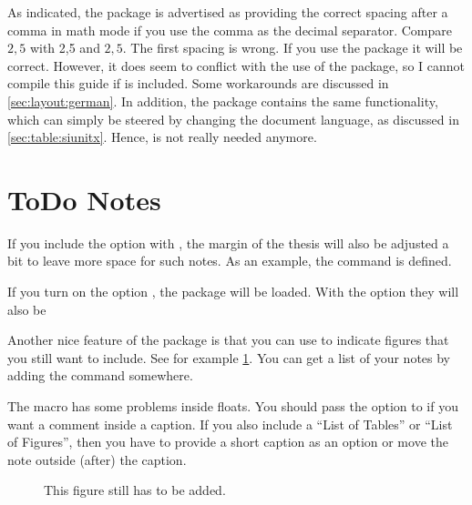 As indicated, the  package is advertised as providing
the correct spacing after a comma in math mode if you use the comma as
the decimal separator. Compare \(2,5\) with 2,5 and \(2{,}5\). The first
spacing is wrong. If you use the  package it will be
correct. However, it does seem to conflict with the use of the
 package, so I cannot compile this guide
if  is included. Some  workarounds are discussed in
\cref{sec:layout:german}. In addition, the 
package contains the same functionality, which can simply be steered
by changing the document language, as discussed in
\cref{sec:table:siunitx}.
Hence,  is not really needed anymore.

\section{ToDo Notes}%
\label{sec:package:todo}

If you include the option  with ,
the margin of the thesis will also be adjusted a bit to leave more space for such notes.
As an example, the  command is defined.

If you turn on the option , the package will be loaded.
With the option  they will also be 

Another nice feature of the  package is that you can use
to indicate figures that you still want to include.
See for example \cref{fig:missing}. You can get a list of your notes
by adding the  command somewhere.

The macro  has some problems inside floats.
You should pass the option  to  if you
want a comment inside a caption. If you also include a \enquote{List of Tables}
or \enquote{List of Figures}, then you have to provide a short caption
as an option or move the note outside (after) the caption.

\begin{figure}[htbp]
  \caption[Optional caption without  so that \enquote{List of Figures} does not break.]{%
    This figure still has to be added.
  }%
  \label{fig:missing}
\end{figure}
